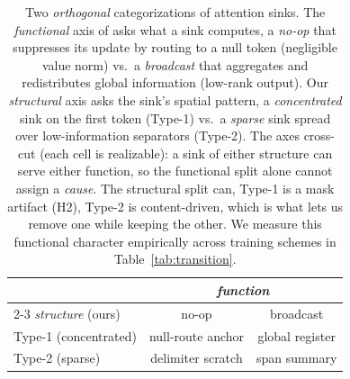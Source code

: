 \begin{table}[h!]
\centering
\footnotesize
\setlength{\tabcolsep}{5pt}
\begin{tabular}{lcc}
\toprule
 & \multicolumn{2}{c}{\emph{function} \citep{fesser2026unifying}} \\
\cmidrule(lr){2-3}
\emph{structure} (ours) & no-op & broadcast \\
\midrule
Type-1 (concentrated) & null-route anchor & global register \\
Type-2 (sparse)       & delimiter scratch & span summary \\
\bottomrule
\end{tabular}
\caption{Two \emph{orthogonal} categorizations of attention sinks. The \emph{functional} axis of \citet{fesser2026unifying} asks what a sink computes, a \emph{no-op} that suppresses its update by routing to a null token (negligible value norm) vs.\ a \emph{broadcast} that aggregates and redistributes global information (low-rank output). Our \emph{structural} axis asks the sink's spatial pattern, a \emph{concentrated} sink on the first token (Type-1) vs.\ a \emph{sparse} sink spread over low-information separators (Type-2). The axes cross-cut (each cell is realizable): a sink of either structure can serve either function, so the functional split alone cannot assign a \emph{cause}. The structural split can, Type-1 is a mask artifact (H2), Type-2 is content-driven, which is what lets us remove one while keeping the other. We measure this functional character empirically across training schemes in Table~\ref{tab:transition}.}
\label{tab:categorization}
\end{table}
